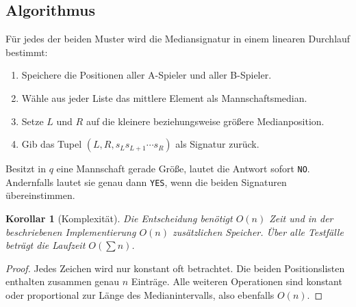 \documentclass[12pt]{article}
\newtheorem{korollar}[satz]{Korollar}
\begin{document}
\subsection*{Algorithmus}

Für jedes der beiden Muster wird die Mediansignatur in einem linearen
Durchlauf bestimmt:
\begin{enumerate}
\item Speichere die Positionen aller A-Spieler und aller B-Spieler.
\item Wähle aus jeder Liste das mittlere Element als Mannschaftsmedian.
\item Setze $L$ und $R$ auf die kleinere beziehungsweise größere
      Medianposition.
\item Gib das Tupel $(L,R,s_Ls_{L+1}\cdots s_R)$ als Signatur zurück.
\end{enumerate}

Besitzt in $q$ eine Mannschaft gerade Größe, lautet die Antwort sofort
\texttt{NO}. Andernfalls lautet sie genau dann \texttt{YES}, wenn die beiden
Signaturen übereinstimmen.

\begin{korollar}[Komplexität]
Die Entscheidung benötigt $O(n)$ Zeit und in der beschriebenen
Implementierung $O(n)$ zusätzlichen Speicher. Über alle Testfälle beträgt die
Laufzeit $O(\sum n)$.
\end{korollar}

\begin{proof}
Jedes Zeichen wird nur konstant oft betrachtet. Die beiden Positionslisten
enthalten zusammen genau $n$ Einträge. Alle weiteren Operationen sind
konstant oder proportional zur Länge des Medianintervalls, also ebenfalls
$O(n)$.
\end{proof}
\end{document}
